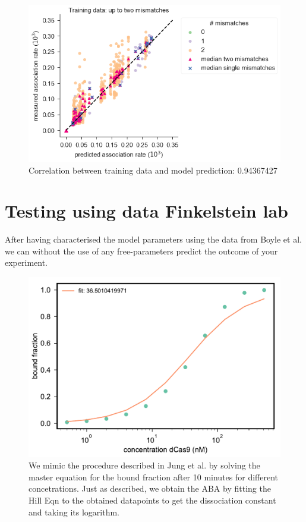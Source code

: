 \documentclass[a4paper,twoside]{revtex4-1}
\begin{document}
\begin{figure}[H]
	\centering
	\includegraphics[scale=0.5]{correlation_plot_Boyle}
	\caption{Correlation between training data and model prediction: 0.94367427}
\end{figure}





\section*{Testing using data Finkelstein lab}
After having characterised the model parameters using the data from Boyle et al. we can without the use of any free-parameters predict the outcome of your experiment. 

\begin{figure}[H]
	\centering
	\includegraphics[width=\textwidth]{ABA_Hill_Eqn}
	\caption{We mimic the procedure described in Jung et al. by solving the master equation for the bound fraction after 10 minutes for different concetrations. Just as described, we obtain the ABA by fitting the Hill Eqn to the obtained datapoints to get the dissociation constant and taking its logarithm.  }
\end{figure}
\end{document}
